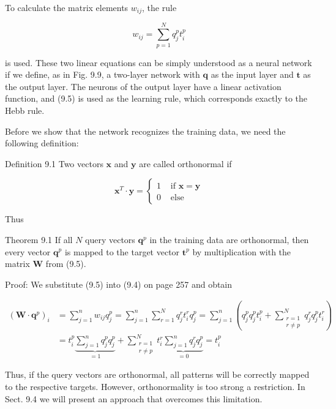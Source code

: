 \documentclass[10pt]{article}
\begin{document}
To calculate the matrix elements $w_{i j}$, the rule


\begin{equation*}
w_{i j}=\sum_{p=1}^{N} q_{j}^{p} t_{i}^{p} \tag{9.5}
\end{equation*}


is used. These two linear equations can be simply understood as a neural network if we define, as in Fig. 9.9, a two-layer network with $\boldsymbol{q}$ as the input layer and $\boldsymbol{t}$ as the output layer. The neurons of the output layer have a linear activation function, and (9.5) is used as the learning rule, which corresponds exactly to the Hebb rule.

Before we show that the network recognizes the training data, we need the following definition:

Definition 9.1 Two vectors $\boldsymbol{x}$ and $\boldsymbol{y}$ are called orthonormal if

$$
\boldsymbol{x}^{T} \cdot \boldsymbol{y}= \begin{cases}1 & \text { if } \boldsymbol{x}=\boldsymbol{y} \\ 0 & \text { else }\end{cases}
$$

Thus

Theorem 9.1 If all $N$ query vectors $\boldsymbol{q}^{p}$ in the training data are orthonormal, then every vector $\boldsymbol{q}^{p}$ is mapped to the target vector $\boldsymbol{t}^{p}$ by multiplication with the matrix $\boldsymbol{W}$ from (9.5).

Proof: We substitute (9.5) into (9.4) on page 257 and obtain

$$
\begin{aligned}
\left(\boldsymbol{W} \cdot \boldsymbol{q}^{p}\right)_{i} & =\sum_{j=1}^{n} w_{i j} q_{j}^{p}=\sum_{j=1}^{n} \sum_{r=1}^{N} q_{j}^{r} t_{i}^{r} q_{j}^{p}=\sum_{j=1}^{n}\left(q_{j}^{p} q_{j}^{p} t_{i}^{p}+\sum_{\substack{r=1 \\
r \neq p}}^{N} q_{j}^{r} q_{j}^{p} t_{i}^{r}\right) \\
& =t_{i}^{p} \underbrace{\sum_{j=1}^{n} q_{j}^{p} q_{j}^{p}}_{=1}+\sum_{\substack{r=1 \\
r \neq p}}^{N} t_{i}^{r} \underbrace{\sum_{j=1}^{n} q_{j}^{r} q_{j}^{p}}_{=0}=t_{i}^{p}
\end{aligned}
$$

Thus, if the query vectors are orthonormal, all patterns will be correctly mapped to the respective targets. However, orthonormality is too strong a restriction. In Sect. 9.4 we will present an approach that overcomes this limitation.
\end{document}
